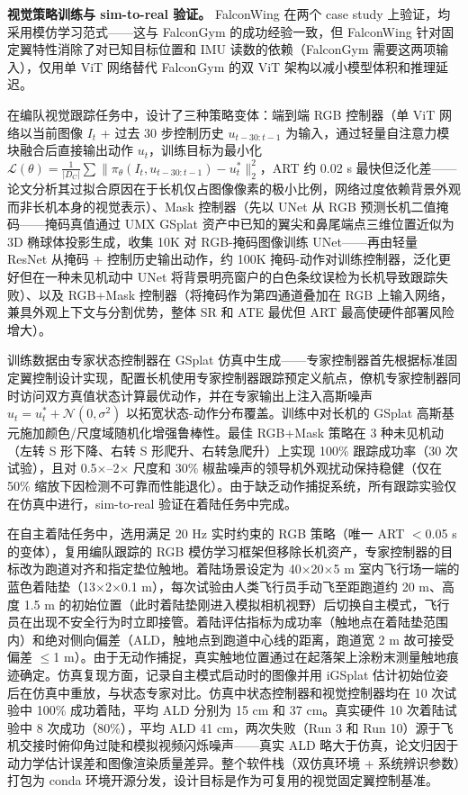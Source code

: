 \textbf{视觉策略训练与 sim-to-real 验证。}
FalconWing 在两个 case study 上验证，均采用模仿学习范式——这与 FalconGym 的成功经验一致，但 FalconWing 针对固定翼特性消除了对已知目标位置和 IMU 读数的依赖（FalconGym 需要这两项输入），仅用单 ViT 网络替代 FalconGym 的双 ViT 架构以减小模型体积和推理延迟。

在编队视觉跟踪任务中，设计了三种策略变体：端到端 RGB 控制器（单 ViT 网络以当前图像 $I_t$ + 过去 30 步控制历史 $u_{t-30:t-1}$ 为输入，通过轻量自注意力模块融合后直接输出动作 $u_t$，训练目标为最小化 $\mathcal{L}(\theta) = \frac{1}{|D_C|} \sum \| \pi_\theta(I_t, u_{t-30:t-1}) - u_t^* \|_2^2$，ART 约 0.02 s 最快但泛化差——论文分析其过拟合原因在于长机仅占图像像素的极小比例，网络过度依赖背景外观而非长机本身的视觉表示）、Mask 控制器（先以 UNet 从 RGB 预测长机二值掩码——掩码真值通过 UMX GSplat 资产中已知的翼尖和鼻尾端点三维位置近似为 3D 椭球体投影生成，收集 10K 对 RGB-掩码图像训练 UNet——再由轻量 ResNet 从掩码 + 控制历史输出动作，约 100K 掩码-动作对训练控制器，泛化更好但在一种未见机动中 UNet 将背景明亮窗户的白色条纹误检为长机导致跟踪失败）、以及 RGB+Mask 控制器（将掩码作为第四通道叠加在 RGB 上输入网络，兼具外观上下文与分割优势，整体 SR 和 ATE 最优但 ART 最高使硬件部署风险增大）。

训练数据由专家状态控制器在 GSplat 仿真中生成——专家控制器首先根据标准固定翼控制设计实现，配置长机使用专家控制器跟踪预定义航点，僚机专家控制器同时访问双方真值状态计算最优动作，并在专家输出上注入高斯噪声 $u_t = u_t^* + \mathcal{N}(0, \sigma^2)$ 以拓宽状态-动作分布覆盖。训练中对长机的 GSplat 高斯基元施加颜色/尺度域随机化增强鲁棒性。最佳 RGB+Mask 策略在 3 种未见机动（左转 S 形下降、右转 S 形爬升、右转急爬升）上实现 100\% 跟踪成功率（30 次试验），且对 0.5$\times$--2$\times$ 尺度和 30\% 椒盐噪声的领导机外观扰动保持稳健（仅在 50\% 缩放下因检测不可靠而性能退化）。由于缺乏动作捕捉系统，所有跟踪实验仅在仿真中进行，sim-to-real 验证在着陆任务中完成。

在自主着陆任务中，选用满足 20 Hz 实时约束的 RGB 策略（唯一 ART $<$0.05 s 的变体），复用编队跟踪的 RGB 模仿学习框架但移除长机资产，专家控制器的目标改为跑道对齐和指定垫位触地。着陆场景设定为 40$\times$20$\times$5 m 室内飞行场一端的蓝色着陆垫（13$\times$2$\times$0.1 m），每次试验由人类飞行员手动飞至距跑道约 20 m、高度 1.5 m 的初始位置（此时着陆垫刚进入模拟相机视野）后切换自主模式，飞行员在出现不安全行为时立即接管。着陆评估指标为成功率（触地点在着陆垫范围内）和绝对侧向偏差（ALD，触地点到跑道中心线的距离，跑道宽 2 m 故可接受偏差 $\leq$1 m）。由于无动作捕捉，真实触地位置通过在起落架上涂粉末测量触地痕迹确定。仿真复现方面，记录自主模式启动时的图像并用 iGSplat 估计初始位姿后在仿真中重放，与状态专家对比。仿真中状态控制器和视觉控制器均在 10 次试验中 100\% 成功着陆，平均 ALD 分别为 15 cm 和 37 cm。真实硬件 10 次着陆试验中 8 次成功（80\%），平均 ALD 41 cm，两次失败（Run 3 和 Run 10）源于飞机交接时俯仰角过陡和模拟视频闪烁噪声——真实 ALD 略大于仿真，论文归因于动力学估计误差和图像渲染质量差异。整个软件栈（双仿真环境 + 系统辨识参数）打包为 conda 环境开源分发，设计目标是作为可复用的视觉固定翼控制基准。

